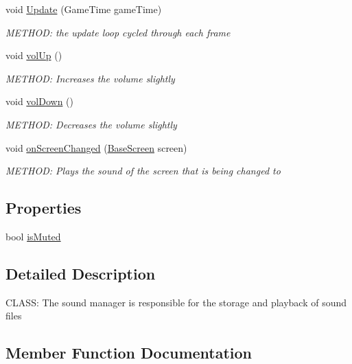 \begin{DoxyCompactItemize}
void \hyperlink{a00546_a43e47a47daa91f3b1d0f38b3dcb0323e}{Update} (Game\+Time game\+Time)
\begin{DoxyCompactList}\small\item\em M\+E\+T\+H\+OD\+: the update loop cycled through each frame \end{DoxyCompactList}\item 
void \hyperlink{a00546_af9d82c533dfd90077b275f2b09ee90b0}{vol\+Up} ()
\begin{DoxyCompactList}\small\item\em M\+E\+T\+H\+OD\+: Increases the volume slightly \end{DoxyCompactList}\item 
void \hyperlink{a00546_a888a7942f63cc582f7b73d61b69ebbac}{vol\+Down} ()
\begin{DoxyCompactList}\small\item\em M\+E\+T\+H\+OD\+: Decreases the volume slightly \end{DoxyCompactList}\item 
void \hyperlink{a00546_a8dfbb15525871b87e6cdcf744b070139}{on\+Screen\+Changed} (\hyperlink{a00550}{Base\+Screen} screen)
\begin{DoxyCompactList}\small\item\em M\+E\+T\+H\+OD\+: Plays the sound of the screen that is being changed to \end{DoxyCompactList}\end{DoxyCompactItemize}
\subsection*{Properties}
\begin{DoxyCompactItemize}
\item 
bool \hyperlink{a00546_a2a4a319a1d395e58c2b10f393475a0c9}{is\+Muted}
\end{DoxyCompactItemize}


\subsection{Detailed Description}
C\+L\+A\+SS\+: The sound manager is responsible for the storage and playback of sound files 



\subsection{Member Function Documentation}
\mbox{\label{a00546_a06224065983b6fe162de98b8dcc944c2}} 
